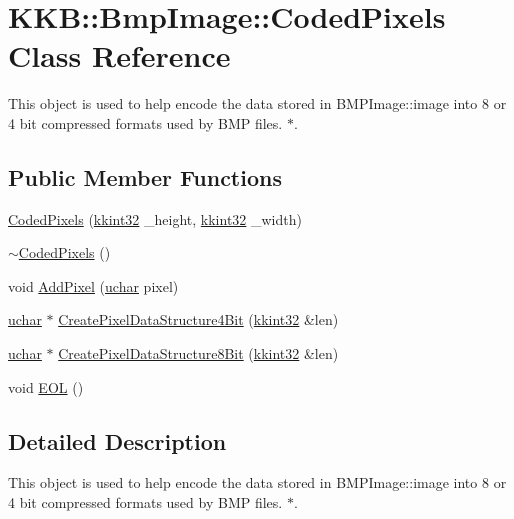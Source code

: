 \hypertarget{class_bmp_image_1_1_coded_pixels}{}\section{K\+KB\+:\+:Bmp\+Image\+:\+:Coded\+Pixels Class Reference}
\label{class_bmp_image_1_1_coded_pixels}


This object is used to help encode the data stored in B\+M\+P\+Image\+::image into 8 or 4 bit compressed formats used by B\+MP files. $\ast$.  


\subsection*{Public Member Functions}
\begin{DoxyCompactItemize}
\item 
\hyperlink{class_bmp_image_1_1_coded_pixels_af59dd3feabc1ae2a88654383bcd8e15e}{Coded\+Pixels} (\hyperlink{namespace_k_k_b_a8fa4952cc84fda1de4bec1fbdd8d5b1b}{kkint32} \+\_\+height, \hyperlink{namespace_k_k_b_a8fa4952cc84fda1de4bec1fbdd8d5b1b}{kkint32} \+\_\+width)
\item 
\hyperlink{class_bmp_image_1_1_coded_pixels_aa1c2fdcc56e2a6f0c5e3cd8d403a4839}{$\sim$\+Coded\+Pixels} ()
\item 
void \hyperlink{class_bmp_image_1_1_coded_pixels_a0ddc3f25a9dabfa5abb34ca6bc30f35a}{Add\+Pixel} (\hyperlink{namespace_k_k_b_ace9969169bf514f9ee6185186949cdf7}{uchar} pixel)
\item 
\hyperlink{namespace_k_k_b_ace9969169bf514f9ee6185186949cdf7}{uchar} $\ast$ \hyperlink{class_bmp_image_1_1_coded_pixels_a24e3b9d2c2762abd06f8d42aa465ac18}{Create\+Pixel\+Data\+Structure4\+Bit} (\hyperlink{namespace_k_k_b_a8fa4952cc84fda1de4bec1fbdd8d5b1b}{kkint32} \&len)
\item 
\hyperlink{namespace_k_k_b_ace9969169bf514f9ee6185186949cdf7}{uchar} $\ast$ \hyperlink{class_bmp_image_1_1_coded_pixels_a56efbf027da1579db01c2bcd8d223a7f}{Create\+Pixel\+Data\+Structure8\+Bit} (\hyperlink{namespace_k_k_b_a8fa4952cc84fda1de4bec1fbdd8d5b1b}{kkint32} \&len)
\item 
void \hyperlink{class_bmp_image_1_1_coded_pixels_aa885a381c15fdd3a1971c0a658d4f009}{E\+OL} ()
\end{DoxyCompactItemize}


\subsection{Detailed Description}
This object is used to help encode the data stored in B\+M\+P\+Image\+::image into 8 or 4 bit compressed formats used by B\+MP files. $\ast$. 


